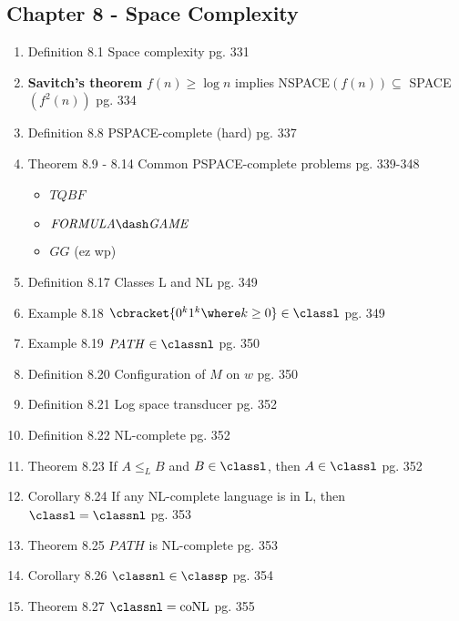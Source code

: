 \documentclass[12pt]{article} %
\newcommand{\theoremitem}[3]{\item #1 \quad #2 \dotfill #3}
\newenvironment{theoremlist} {
    \begin{enumerate}[nosep,leftmargin=*,label={}]
} {
    \end{enumerate}
}
\begin{document}
\subsection{Chapter 8 - Space Complexity}
\begin{theoremlist}
    \theoremitem{Definition 8.1}
    {Space complexity}
    {pg. 331}
    \theoremitem{\textbf{Savitch's theorem}}
    { $f(n)\geq\log{n}$ implies NSPACE$(f(n))\subseteq$ SPACE$(f^2(n))$}
    {pg. 334}
    \theoremitem{Definition 8.8}
    {PSPACE-complete (hard)}
    {pg. 337}

    \theoremitem{Theorem 8.9 - 8.14}
    {Common PSPACE-complete problems}
    {pg. 339-348}
    \begin{multicols}{2}
    \begin{itemize}[nosep]
        \item $\mathit{TQBF}$
        \item $\mathit{FORMULA\dash GAME}$
        \item $\mathit{GG}$ (ez wp)
    \end{itemize}
    \end{multicols}
    
    \theoremitem{Definition 8.17}
    {Classes L and NL}
    {pg. 349}
    \theoremitem{Example 8.18}
    {$\cbracket{0^k 1^k \where k\geq 0}\in\classl$}
    {pg. 349}
    \theoremitem{Example 8.19}
    {$\mathit{PATH}\in\classnl$}
    {pg. 350}
    \theoremitem{Definition 8.20}
    {Configuration of $M$ on $w$}
    {pg. 350}
    \theoremitem{Definition 8.21}
    {Log space transducer}
    {pg. 352}
    \theoremitem{Definition 8.22}
    {NL-complete}
    {pg. 352}
    \theoremitem{Theorem 8.23}
    {If $A\leq_L B$ and $B\in\classl$, then $A\in\classl$}
    {pg. 352}
    \theoremitem{Corollary 8.24}
    {If any NL-complete language is in L, then $\classl=\classnl$}
    {pg. 353}
    \theoremitem{Theorem 8.25}
    {$\mathit{PATH}$ is NL-complete}
    {pg. 353}
    \theoremitem{Corollary 8.26}
    {$\classnl\in\classp$}
    {pg. 354}
    \theoremitem{Theorem 8.27}
    {\textbf{$\classnl=\text{coNL}$}}
    {pg. 355}


\end{theoremlist}
\end{document}
